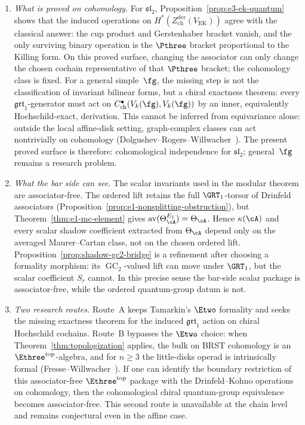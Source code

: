 \begin{remark}
\begin{enumerate}[label=\textup{(\roman*)}]
\item \emph{What is proved on cohomology.}
 For $\mathfrak{sl}_2$, Proposition~\ref{prop:e3-ek-quantum} shows
 that the induced operations on
 $H^*(Z^{\mathrm{der}}_{\mathrm{ch}}(V_{\mathrm{EK}}))$
 agree with the classical answer: the cup product and
 Gerstenhaber bracket vanish, and the only surviving binary operation
 is the $\Pthree$ bracket proportional to the Killing form. On this
 proved surface, changing the associator can only change the chosen
 cochain representative of that $\Pthree$ bracket; the cohomology class
 is fixed. For a general simple~$\fg$, the missing step is not the
 classification of invariant bilinear forms, but a chiral exactness
 theorem: every $\mathfrak{grt}_1$-generator must act on
 $C^\bullet_{\mathrm{ch}}(V_k(\fg),V_k(\fg))$
 by an inner, equivalently Hochschild-exact, derivation. This cannot
 be inferred from equivariance alone: outside the local affine-disk
 setting, graph-complex classes can act nontrivially on cohomology
 \textup{(}Dolgushev--Rogers--Willwacher~\cite{DolgushevRogersWillwacher15}\textup{)}.
 The present proved surface is therefore: cohomological independence
 for $\mathfrak{sl}_2$; general~$\fg$ remains a research problem.

\item \emph{What the bar side can see.}
 The scalar invariants used in the modular theorem are
 associator-free. The ordered lift retains the full $\GRT_1$-torsor of
 Drinfeld associators
 \textup{(}Proposition~\textup{\ref{prop:e1-nonsplitting-obstruction}}\textup{)},
 but Theorem~\ref{thm:e1-mc-element} gives
 $\operatorname{av}(\Theta_\cA^{E_1}) = \Theta_\cA$.
 Hence $\kappa(\cA)$ and every scalar shadow coefficient extracted from
 $\Theta_\cA$ depend only on the averaged Maurer--Cartan class, not on
 the chosen ordered lift. Proposition~\ref{prop:shadow-gc2-bridge} is a
 refinement after choosing a formality morphism: its
 $\operatorname{GC}_2$-valued lift can move under $\GRT_1$, but the
 scalar coefficient $S_r$ cannot. In this precise sense the bar-side
 scalar package is associator-free, while the ordered quantum-group
 datum is not.

\item \emph{Two research routes.}
 Route~A keeps Tamarkin's $\Etwo$ formality and seeks the missing
 exactness theorem for the induced $\mathfrak{grt}_1$ action on chiral
 Hochschild cochains. Route~B bypasses the $\Etwo$ choice: when
 Theorem~\ref{thm:topologization} applies, the bulk on BRST cohomology
 is an $\Ethree^{\mathrm{top}}$-algebra, and for $n \geq 3$ the
 little-disks operad is intrinsically formal
 \textup{(}Fresse--Willwacher~\cite{FresseWillwacher20}\textup{)}.
 If one can identify the boundary restriction of this
 associator-free $\Ethree^{\mathrm{top}}$ package with the
 Drinfeld--Kohno operations on cohomology, then the cohomological
 chiral quantum-group equivalence becomes associator-free. This second
 route is unavailable at the chain level and remains conjectural even
 in the affine case.
\end{enumerate}
\end{remark}


